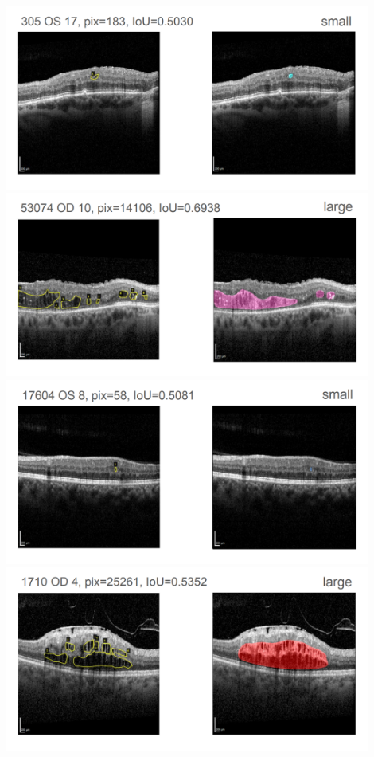 \includegraphics[width=0.9\textwidth]{./pic/Segmentierung/Segmentierungsergebnisse/13.PNG}
\includegraphics[width=0.9\textwidth]{./pic/Segmentierung/Segmentierungsergebnisse/14.PNG}
\includegraphics[width=0.9\textwidth]{./pic/Segmentierung/Segmentierungsergebnisse/15.PNG}
\includegraphics[width=0.9\textwidth]{./pic/Segmentierung/Segmentierungsergebnisse/16.PNG}
